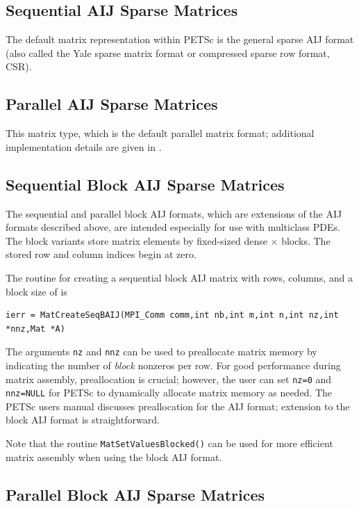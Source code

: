 \subsection{Sequential AIJ Sparse Matrices}

The default matrix representation within PETSc is the general sparse
AIJ format (also called the Yale sparse matrix format or compressed
sparse row format, CSR).

\subsection{Parallel AIJ Sparse Matrices}

This matrix type, which is the
default parallel matrix format; additional implementation details are
given in \cite{petsc-efficient}.

\subsection{Sequential Block AIJ Sparse Matrices}

The sequential and parallel block AIJ formats, which are extensions of
the AIJ formats described above, are intended especially for use with
multiclass PDEs.  The block variants store matrix elements by
fixed-sized dense  $\times$  blocks.  The stored row
and column indices begin at zero.

The routine for creating a sequential block AIJ matrix with 
rows,  columns, and a block size of  is
\begin{lstlisting}
ierr = MatCreateSeqBAIJ(MPI_Comm comm,int nb,int m,int n,int nz,int *nnz,Mat *A)
\end{lstlisting}
The arguments \lstinline{nz} and \lstinline{nnz} can be used to preallocate matrix
memory by indicating the number of {\em block} nonzeros per row.  For good
performance during matrix assembly, preallocation is crucial; however, the
user can set \lstinline{nz=0} and \lstinline{nnz=NULL} for PETSc to dynamically
allocate matrix memory as needed.  The PETSc users manual
discusses preallocation for the AIJ format; extension to the block AIJ
format is straightforward.

Note that the routine \lstinline{MatSetValuesBlocked()}
can be used for more efficient matrix assembly
when using the block AIJ format.

\subsection{Parallel Block AIJ Sparse Matrices}

